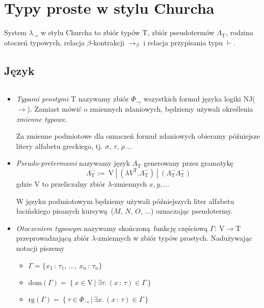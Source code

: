 \section{Typy proste w stylu Churcha}

System \(\lambda_{\to}\) w stylu Churcha to zbiór typów \(\mathrm{T}\),
zbiór pseudotermów \(\Lambda_{\mathrm{T}}\), rodzina otoczeń typowych,
relacja \(\beta\)-kontrakcji \(\to_{\beta}\) i relacja przypisania typu \(\vdash\).

\subsection{Język}

\begin{definicja}$ $\newline
\begin{itemize}
\item
  \emph{Typami prostymi} \(\mathrm{T}\) nazywamy zbiór \(\Phi_{\to}\) wszystkich formuł języka logiki NJ(\(\to\)). 
    Zamiast mówić o zmiennych zdaniowych, będziemy używali określenia \emph{zmienne typowe}.

    Za zmienne podmiotowe dla oznaczeń formuł zdaniowych obieramy późniejsze litery alfabetu greckiego, tj. \(\sigma,\, \tau,\, \rho\,\dots\)
\item
  \emph{Pseudo-pretermami} nazywamy język \(\Lambda_{\mathrm{T}}\) generowany przez
gramatykę 
\[
  \Lambda^{-}_{\mathrm{T}} := \ \mathrm{V}\ | \ \left (\lambda V^{\mathrm{T}} . \Lambda^{-}_{\mathrm{T}}\right) \ | \ \left (\Lambda^{-}_{\mathrm{T}}\Lambda^{-}_{\mathrm{T}}\right)
\]
    gdzie V to przeliczalny zbiór \(\lambda\)-zmiennych \(x, y, \dots\)
    
    W języku podmiotowym będziemy używali późniejszych liter alfabetu łacińskiego pisanych kursywą (\(M,\, N,\, O,\, \dots\)) oznaczając pseudotermy.
  \item \emph{Otoczeniem typowym} nazywamy skończoną funkcję częściową \(\Gamma:\:\mathrm{V}\to\mathrm{T}\) przeprowadzającą zbiór \(\lambda\)-zmiennych w zbiór typów prostych. Nadużywając notacji piszemy
    \begin{itemize}
      \item \(\Gamma=\{x_1\,:\,\tau_1,\,\dots,\,x_n\,:\,\tau_n\}\)
      \item \(\mathrm{dom}(\Gamma) = \left\{x\in \mathrm{V}\,|\:\exists\tau.\,(x\,:\,\tau)\in\Gamma\right\}\)
      \item \(\mathrm{rg}(\Gamma)=\left\{\tau\in\Phi_{\to}\,|\,\exists x.\,(x\,:\,\tau)\in\Gamma\right\}\)
    \end{itemize}


\end{itemize}
\end{definicja}
